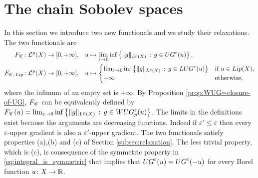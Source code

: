 \documentclass[12pt]{amsart}
\newcommand{\R}{\mathbb{R}}
\newcommand{\X}{{\rm X}}
\newcommand{\Lip}{{\rm Lip}}
\newcommand{\F}{{\rm F}}
\theoremstyle{definition}
\newcommand{\Chain}[1]{\mathscr{C}^{#1}}
\newcommand{\UG}[1]{{\rm UG}^{#1}}
\newcommand{\LUG}[1]{{\rm LUG}^{#1}}
\newcommand{\WUG}[2]{{\rm WUG}_{#1}^{#2}}
\newcommand{\calL}[1]{\mathcal{L}^{#1}}
\renewcommand{\F}[1]{{\rm F}_{{\rm #1}}}
\begin{document}
\section{The chain Sobolev spaces}
\label{sec:chain_sob_space}
In this section we introduce two new functionals and we study their relaxations. The two functionals are
\begin{equation}
    \begin{aligned}
        \F{\Chain{}} \colon \calL{p}(\X) \to  [0,+\infty], \quad &u \mapsto \lim_{\varepsilon \to 0} \inf\left\{ \| g \|_{L^p(\X)}\,:\, g\in \UG{\varepsilon}(u)\right\},\\
        \F{\Chain{},\, \Lip} \colon \calL{p}(\X) \to  [0,+\infty], \quad &u \mapsto \begin{cases}
            \lim_{\varepsilon \to 0} \inf\left\{ \| g \|_{L^p(\X)}\,:\, g\in \LUG{\varepsilon}(u)\right\} &\text{if } u\in \Lip(\X),\\
            +\infty &\text{otherwise},
        \end{cases}
    \end{aligned}
\end{equation}
where the infimum of an empty set is $+\infty$.
By Proposition \ref{prop:WUG=closure-of-UG}, $\F{\Chain{}}$ can be equivalently defined by $\F{\Chain{}}(u) = \lim_{\varepsilon \to 0} \inf\left\{ \| g \|_{L^p(\X)}\,:\, g\in \WUG{p}{\varepsilon}(u)\right\}$. The limits in the definitions exist because the arguments are decreasing functions. Indeed if $\varepsilon' \le \varepsilon$ then every $\varepsilon$-upper gradient is also a $\varepsilon'$-upper gradient. The two functionals satisfy properties (a),(b) and (c) of Section \ref{subsec:relaxation}. The less trivial property, which is (c), is consequence of the symmetric property in \eqref{eq:integral_is_symmetric} that implies that $\UG{\varepsilon}(u) = \UG{\varepsilon}(-u)$ for every Borel function $u\colon \X \to \R$.
\end{document}
